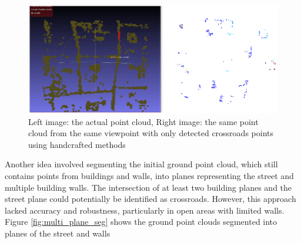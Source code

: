 \documentclass[11pt]{article}
\begin{document}
    \begin{figure}
    \centering
    \includegraphics[width=\textwidth,height=\textheight,keepaspectratio]{images/experiment/crossroads_det_1}
    \caption{
        Left image: the actual point cloud,
        Right image: the same point cloud from the same viewpoint with only detected crossroads points using handcrafted methods
    }
    \label{fig:crossroads_det_1}
    \end{figure}

    Another idea involved segmenting the initial ground point cloud, which still contains points from buildings
    and walls, into planes representing the street and multiple building walls. The intersection of at least two building planes
    and the street plane could potentially be identified as crossroads. However, this approach lacked accuracy and
    robustness, particularly in open areas with limited walls. Figure \ref{fig:multi_plane_seg} shows
    the ground point clouds segmented into planes of the street and walls
\end{document}

